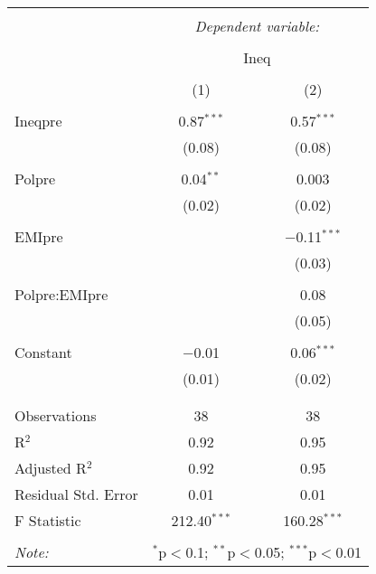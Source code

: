 
\begin{table}[!htbp] \centering 
  \caption{} 
  \label{} 
\begin{tabular}{@{\extracolsep{5pt}}lcc} 
\\[-1.8ex]\hline 
\hline \\[-1.8ex] 
 & \multicolumn{2}{c}{\textit{Dependent variable:}} \\ 
\cline{2-3} 
\\[-1.8ex] & \multicolumn{2}{c}{Ineq} \\ 
\\[-1.8ex] & (1) & (2)\\ 
\hline \\[-1.8ex] 
 Ineqpre & 0.87$^{***}$ & 0.57$^{***}$ \\ 
  & (0.08) & (0.08) \\ 
  & & \\ 
 Polpre & 0.04$^{**}$ & 0.003 \\ 
  & (0.02) & (0.02) \\ 
  & & \\ 
 EMIpre &  & $-$0.11$^{***}$ \\ 
  &  & (0.03) \\ 
  & & \\ 
 Polpre:EMIpre &  & 0.08 \\ 
  &  & (0.05) \\ 
  & & \\ 
 Constant & $-$0.01 & 0.06$^{***}$ \\ 
  & (0.01) & (0.02) \\ 
  & & \\ 
\hline \\[-1.8ex] 
Observations & 38 & 38 \\ 
R$^{2}$ & 0.92 & 0.95 \\ 
Adjusted R$^{2}$ & 0.92 & 0.95 \\ 
Residual Std. Error & 0.01 & 0.01 \\ 
F Statistic & 212.40$^{***}$ & 160.28$^{***}$ \\ 
\hline 
\hline \\[-1.8ex] 
\textit{Note:}  & \multicolumn{2}{r}{$^{*}$p$<$0.1; $^{**}$p$<$0.05; $^{***}$p$<$0.01} \\ 
\end{tabular} 
\end{table} 
